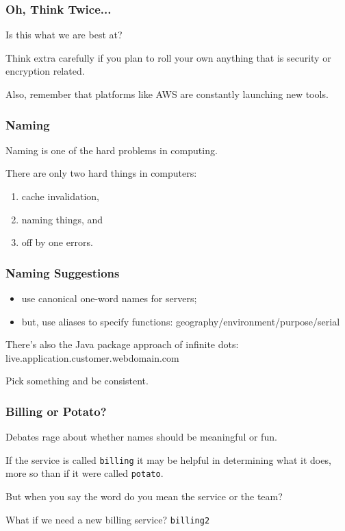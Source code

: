 \begin{frame}
\frametitle{Oh, Think Twice...}

Is this what we are best at?

Think extra carefully if you plan to roll your own anything that is security or encryption related.

Also, remember that platforms like AWS are constantly launching new tools.

\end{frame}

\begin{frame}
\frametitle{Naming}

\Large

Naming is one of the hard problems in computing. 

There are only two hard things in computers:
\begin{enumerate}
\item cache invalidation,
\item naming things, and
\item off by one errors.
\end{enumerate}

\end{frame}



\begin{frame}
\frametitle{Naming Suggestions}

\large

\begin{itemize}
\item use canonical one-word names for servers;
\item but, use aliases to specify functions: geography/environment/purpose/serial
\end{itemize}


There's also the Java package approach of infinite dots: live.application.customer.webdomain.com

Pick something and be consistent.

\end{frame}


\begin{frame}
\frametitle{Billing or Potato?}

Debates rage about whether names should be meaningful or fun.

If the service is called \texttt{billing} it may be helpful in determining what it does, more so than if it were called \texttt{potato}.

But when you say the word do you mean the service or the team?

What if we need a new billing service? \texttt{billing2}

\end{frame}

